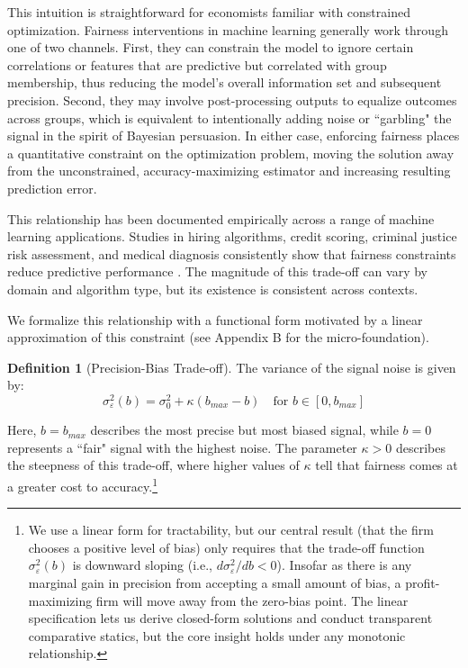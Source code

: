 \documentclass[12pt,a4paper]{article}
\theoremstyle{definition}
\newtheorem{definition}{Definition}
\theoremstyle{remark}
\begin{document}
This intuition is straightforward for economists familiar with constrained optimization. Fairness interventions in machine learning generally work through one of two channels. First, they can constrain the model to ignore certain correlations or features that are predictive but correlated with group membership, thus reducing the model's overall information set and subsequent precision. Second, they may involve post-processing outputs to equalize outcomes across groups, which is equivalent to intentionally adding noise or ``garbling" the signal in the spirit of Bayesian persuasion. In either case, enforcing fairness places a quantitative constraint on the optimization problem, moving the solution away from the unconstrained, accuracy-maximizing estimator and increasing resulting prediction error.

This relationship has been documented empirically across a range of machine learning applications. Studies in hiring algorithms, credit scoring, criminal justice risk assessment, and medical diagnosis consistently show that fairness constraints reduce predictive performance \citep{Kleinberg2017, Chouldechova2017}. The magnitude of this trade-off can vary by domain and algorithm type, but its existence is consistent across contexts.

We formalize this relationship with a functional form motivated by a linear approximation of this constraint (see Appendix B for the micro-foundation).

\begin{definition}[Precision-Bias Trade-off]
The variance of the signal noise is given by:
\begin{equation}
\sigma_\varepsilon^2(b) = \sigma_0^2 + \kappa(b_{max} - b) \quad \text{for } b \in [0, b_{max}]
\end{equation}
\end{definition}

Here, $b=b_{max}$ describes the most precise but most biased signal, while $b=0$ represents a ``fair" signal with the highest noise. The parameter $\kappa > 0$ describes the steepness of this trade-off, where higher values of $\kappa$ tell that fairness comes at a greater cost to accuracy.\footnote{We use a linear form for tractability, but our central result (that the firm chooses a positive level of bias) only requires that the trade-off function $\sigma_\varepsilon^2(b)$ is downward sloping (i.e., $d\sigma_\varepsilon^2/db < 0$). Insofar as there is any marginal gain in precision from accepting a small amount of bias, a profit-maximizing firm will move away from the zero-bias point. The linear specification lets us derive closed-form solutions and conduct transparent comparative statics, but the core insight holds under any monotonic relationship.}
\end{document}
